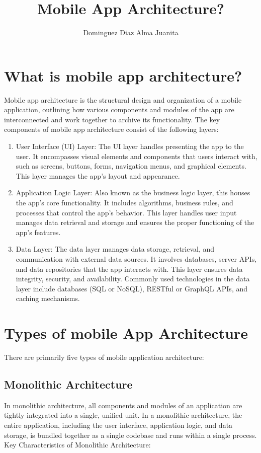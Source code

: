 \documentclass[12pt,a4paper]{article}
\author{Dominguez Diaz Alma Juanita}
\title{Mobile App Architecture?}
\begin{document}
\maketitle
\section*{What is mobile app architecture?}
\justify 
Mobile app architecture is the structural design and organization of a mobile application, outlining how various components and modules of the app are interconnected and work together to archive its functionality.
The key components of mobile app architecture consist of the following layers:
\begin{enumerate}
    \item User Interface (UI) Layer: The UI layer handles presenting the app to the user. It encompasses visual elements and components that users interact with, such as screens, buttons, forms, navigation menus, and graphical elements. This layer manages the app's layout and appearance.

    \item Application Logic Layer: Also known as the business logic layer, this houses the app's core functionality. It includes algorithms, business rules, and processes that control the app’s behavior. This layer handles user input manages data retrieval and storage and ensures the proper functioning of the app’s features.
    
    \item Data Layer: The data layer manages data storage, retrieval, and communication with external data sources. It involves databases, server APIs, and data repositories that the app interacts with. This layer ensures data integrity, security, and availability. Commonly used technologies in the data layer include databases (SQL or NoSQL), RESTful or GraphQL APIs, and caching mechanisms.
    
\end{enumerate}

\section{Types of mobile App Architecture}
\justify There are primarily five types of mobile application architecture:
\subsection{Monolithic Architecture}
\justify In monolithic architecture, all components and modules of an application are tightly integrated into a single, unified unit. In a monolithic architecture, the entire application, including the user interface, application logic, and data storage, is bundled together as a single codebase and runs within a single process. 
Key Characteristics of Monolithic Architecture:
\end{document}
